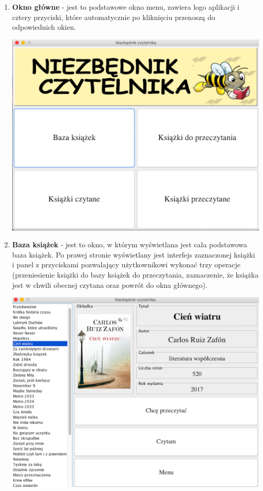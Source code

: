 \documentclass[a4paper,10pt]{article}
\begin{document}
\begin{enumerate}
\item \textbf{Okno główne} - jest to podstawowe okno menu, zawiera logo aplikacji i cztery przyciski, które automatycznie po kliknięciu przenoszą do odpowiednich okien.
\begin{center}
\includegraphics[scale=0.18]{OknoGlowne.png}
\end{center}

\item \textbf{Baza książek} - jest to okno, w którym wyświetlana jest cała podstawowa baza książek. Po prawej stronie wyświetlany jest interfejs zaznaczonej książki i panel z przyciskami pozwalający użytkownikowi wykonać trzy operacje (przeniesienie książki do bazy książek do przeczytania, zaznaczenie, że książka jest w chwili obecnej czytana oraz powrót do okna głównego).
\begin{center}
\includegraphics[scale=0.18]{BazaKsiazek.png}
\end{center}


\end{enumerate}
\end{document}
